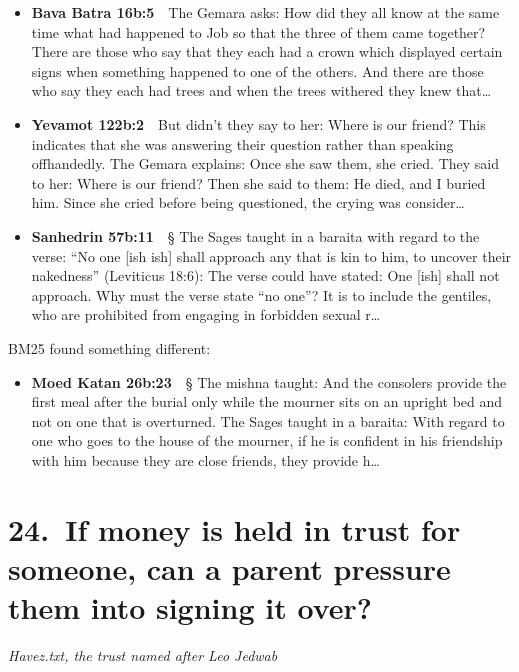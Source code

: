 \documentclass[11pt,a4paper]{article}
\begin{document}
\begin{itemize}[leftmargin=1.2em,itemsep=3pt]
\item {\color{ref}\textbf{Bava Batra 16b:5}}\ \ The Gemara asks: How did they all know at the same time what had happened to Job so that the three of them came together? There are those who say that they each had a crown which displayed certain signs when something happened to one of the others. And there are those who say they each had trees and when the trees withered they knew that\ldots
\item {\color{ref}\textbf{Yevamot 122b:2}}\ \ But didn’t they say to her: Where is our friend? This indicates that she was answering their question rather than speaking offhandedly. The Gemara explains: Once she saw them, she cried. They said to her: Where is our friend? Then she said to them: He died, and I buried him. Since she cried before being questioned, the crying was consider\ldots
\item {\color{ref}\textbf{Sanhedrin 57b:11}}\ \ § The Sages taught in a baraita with regard to the verse: “No one [ish ish] shall approach any that is kin to him, to uncover their nakedness” (Leviticus 18:6): The verse could have stated: One [ish] shall not approach. Why must the verse state “no one”? It is to include the gentiles, who are prohibited from engaging in forbidden sexual r\ldots
\end{itemize}
{\color{quiet}\small BM25 found something different:}
\begin{itemize}[leftmargin=1.2em]
\item {\color{ref}\textbf{Moed Katan 26b:23}}\ \ § The mishna taught: And the consolers provide the first meal after the burial only while the mourner sits on an upright bed and not on one that is overturned. The Sages taught in a baraita: With regard to one who goes to the house of the mourner, if he is confident in his friendship with him because they are close friends, they provide h\ldots
\end{itemize}

\section*{24.\ If money is held in trust for someone, can a parent pressure them into signing it over?}
{\color{quiet}\small\textit{Havez.txt, the trust named after Leo Jedwab}}
\end{document}
